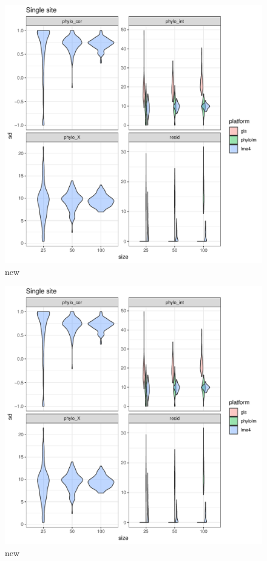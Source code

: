 \begin{center}
\begin{figure}[h]
  \includegraphics[scale=0.8,page=4]{./git_push/plot.Rout.pdf}
  \caption{new}
\end{figure}
\end{center}


\begin{center}
\begin{figure}[h]
  \includegraphics[scale=0.8,page=6]{./git_push/plot.Rout.pdf}
  \caption{new}
\end{figure}
\end{center}


